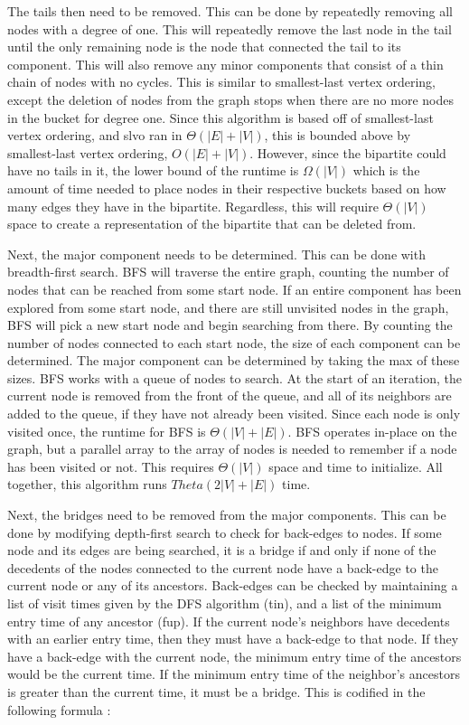 \documentclass{article}
\begin{document}
        \par
        The tails then need to be removed. This can be done by repeatedly removing all nodes with a degree of one. This will repeatedly remove the last node in the tail until the only remaining node is the node that connected the tail to its component. This will also remove any minor components that consist of a thin chain of nodes with no cycles. This is similar to smallest-last vertex ordering, except the deletion of nodes from the graph stops when there are no more nodes in the bucket for degree one. Since this algorithm is based off of smallest-last vertex ordering, and slvo ran in $\Theta\left(|E| + |V|\right)$, this is bounded above by smallest-last vertex ordering, $O\left(|E| + |V|\right)$. However, since the bipartite could have no tails in it, the lower bound of the runtime is $\Omega(|V|)$ which is the amount of time needed to place nodes in their respective buckets based on how many edges they have in the bipartite. Regardless, this will require $\Theta(|V|)$ space to create a representation of the bipartite that can be deleted from.
        \par
        Next, the major component needs to be determined. This can be done with breadth-first search. BFS will traverse the entire graph, counting the number of nodes that can be reached from some start node. If an entire component has been explored from some start node, and there are still unvisited nodes in the graph, BFS will pick a new start node and begin searching from there. By counting the number of nodes connected to each start node, the size of each component can be determined. The major component can be determined by taking the max of these sizes. BFS works with a queue of nodes to search. At the start of an iteration, the current node is removed from the front of the queue, and all of its neighbors are added to the queue, if they have not already been visited. Since each node is only visited once, the runtime for BFS is $\Theta(|V| + |E|)$. BFS operates in-place on the graph, but a parallel array to the array of nodes is needed to remember if a node has been visited or not. This requires $\Theta(|V|)$ space and time to initialize. All together, this algorithm runs $Theta(2|V| + |E|)$ time.
        \par
        Next, the bridges need to be removed from the major components. This can be done by modifying depth-first search to check for back-edges to nodes. If some node and its edges are being searched, it is a bridge if and only if none of the decedents of the nodes connected to the current node have a back-edge to the current node or any of its ancestors. Back-edges can be checked by maintaining a list of visit times given by the DFS algorithm (tin), and a list of the minimum entry time of any ancestor (fup). If the current node's neighbors have decedents with an earlier entry time, then they must have a back-edge to that node. If they have a back-edge with the current node, the minimum entry time of the ancestors would be the current time. If the minimum entry time of the neighbor's ancestors is greater than the current time, it must be a bridge. This is codified in the following formula \cite{bridges}:
\end{document}
